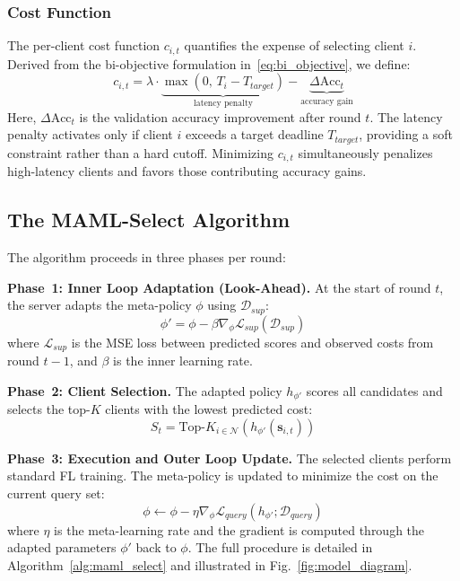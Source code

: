 \documentclass[journal]{IEEEtran}
\begin{document}
\subsubsection{Cost Function}
The per-client cost function $c_{i,t}$ quantifies the expense of selecting client $i$. Derived from the bi-objective formulation in~\eqref{eq:bi_objective}, we define:
\begin{equation}
	c_{i,t} = \lambda \cdot \underbrace{\max(0, \, T_i - T_{target})}_{\text{latency penalty}} - \underbrace{\Delta \text{Acc}_t}_{\text{accuracy gain}}
	\label{eq:cost}
\end{equation}
Here, $\Delta \text{Acc}_t$ is the validation accuracy improvement after round $t$. The latency penalty activates only if client $i$ exceeds a target deadline $T_{target}$, providing a soft constraint rather than a hard cutoff. Minimizing $c_{i,t}$ simultaneously penalizes high-latency clients and favors those contributing accuracy gains.

\subsection{The MAML-Select Algorithm}
The algorithm proceeds in three phases per round:

\textbf{Phase~1: Inner Loop Adaptation (Look-Ahead).}
At the start of round $t$, the server adapts the meta-policy $\phi$ using $\mathcal{D}_{sup}$:
\begin{equation}
	\phi' = \phi - \beta \nabla_\phi \mathcal{L}_{sup}(\mathcal{D}_{sup})
	\label{eq:inner_loop}
\end{equation}
where $\mathcal{L}_{sup}$ is the MSE loss between predicted scores and observed costs from round $t-1$, and $\beta$ is the inner learning rate.

\textbf{Phase~2: Client Selection.}
The adapted policy $h_{\phi'}$ scores all candidates and selects the top-$K$ clients with the lowest predicted cost:
\begin{equation}
	S_t = \text{Top-}K_{i \in \mathcal{N}} \left( h_{\phi'}(\bm{s}_{i,t}) \right)
	\label{eq:selection}
\end{equation}

\textbf{Phase~3: Execution and Outer Loop Update.}
The selected clients perform standard FL training. The meta-policy is updated to minimize the cost on the current query set:
\begin{equation}
	\phi \leftarrow \phi - \eta \nabla_\phi \mathcal{L}_{query}(h_{\phi'}; \mathcal{D}_{query})
	\label{eq:outer_loop}
\end{equation}
where $\eta$ is the meta-learning rate and the gradient is computed through the adapted parameters $\phi'$ back to $\phi$. The full procedure is detailed in Algorithm~\ref{alg:maml_select} and illustrated in Fig.~\ref{fig:model_diagram}.
\end{document}
